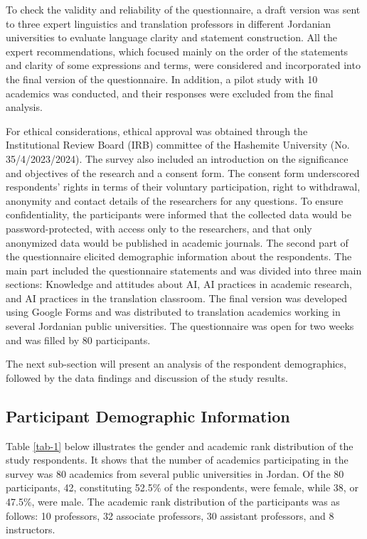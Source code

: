 \documentclass[english]{textolivre}
\begin{document}
To check the validity and reliability of the questionnaire, a draft version was sent to three expert linguistics and translation professors in different Jordanian universities to evaluate language clarity and statement construction. All the expert recommendations, which focused mainly on the order of the statements and clarity of some expressions and terms, were considered and incorporated into the final version of the questionnaire. In addition, a pilot study with 10 academics was conducted, and their responses were excluded from the final analysis.

For ethical considerations, ethical approval was obtained through the Institutional Review Board (IRB) committee of the Hashemite University (No. 35/4/2023/2024). The survey also included an introduction on the significance and objectives of the research and a consent form. The consent form underscored respondents’ rights in terms of their voluntary participation, right to withdrawal, anonymity and contact details of the researchers for any questions. To ensure confidentiality, the participants were informed that the collected data would be password-protected, with access only to the researchers, and that only anonymized data would be published in academic journals. The second part of the questionnaire elicited demographic information about the respondents. The main part included the questionnaire statements and was divided into three main sections: Knowledge and attitudes about AI, AI practices in academic research, and AI practices in the translation classroom. The final version was developed using Google Forms and was distributed to translation academics working in several Jordanian public universities. The questionnaire was open for two weeks and was filled by 80 participants. 

The next sub-section will present an analysis of the respondent demographics, followed by the data findings and discussion of the study results.

\subsection{Participant Demographic Information}
Table \ref{tab-1} below illustrates the gender and academic rank distribution of the study respondents. It shows that the number of academics participating in the survey was 80 academics from several public universities in Jordan. Of the 80 participants, 42, constituting 52.5\% of the respondents, were female, while 38, or 47.5\%, were male. The academic rank distribution of the participants was as follows: 10 professors, 32 associate professors, 30 assistant professors, and 8 instructors.
\end{document}
